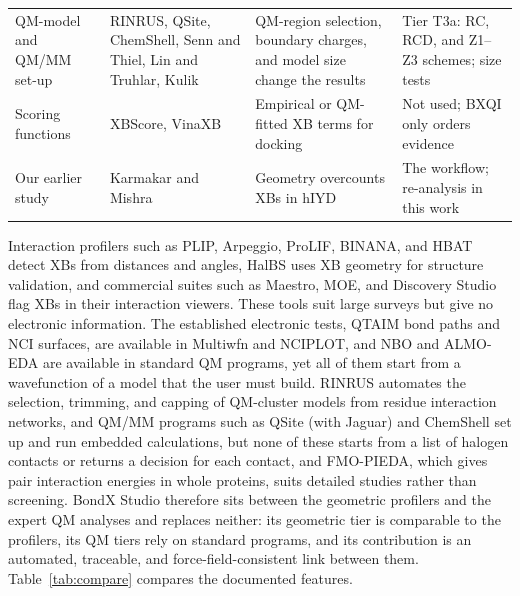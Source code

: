\documentclass[journal=jcisd8,manuscript=article,layout=two-column]{achemso}
\newcommand{\BX}{BondX Studio}
\begin{document}
\begin{table}[t]
\begin{tabularx}{\textwidth}{@{}L{2.4cm} L{4.6cm} >{\raggedright\arraybackslash}X L{3.9cm}@{}}
QM-model and QM/MM set-up & RINRUS,\cite{Summers2021} QSite,\cite{Murphy2000QSite} ChemShell,\cite{Lu2019ChemShell} Senn and Thiel,\cite{SennThiel2009} Lin and Truhlar,\cite{LinTruhlar2005} Kulik\cite{Kulik2016} & QM-region selection, boundary charges, and model size change the results & Tier T3a: RC, RCD, and Z1--Z3 schemes; size tests \\
Scoring functions & XBScore,\cite{Zimmermann2015} VinaXB\cite{Koebel2016} & Empirical or QM-fitted XB terms for docking & Not used; BXQI only orders evidence \\
Our earlier study & Karmakar and Mishra\cite{Karmakar2026} & Geometry overcounts XBs in hIYD & The workflow; re-analysis in this work \\
\bottomrule
\end{tabularx}
\end{table}

Interaction profilers such as PLIP, Arpeggio, ProLIF, BINANA, and HBAT detect XBs from distances and angles,\cite{Salentin2015,Adasme2021,Jubb2017,Bouysset2021,Young2022,HBAT2} HalBS uses XB geometry for structure validation,\cite{HalBS2025} and commercial suites such as Maestro, MOE, and Discovery Studio flag XBs in their interaction viewers.\cite{Maestro,MOE,DiscoveryStudio} These tools suit large surveys but give no electronic information. The established electronic tests, QTAIM bond paths and NCI surfaces,\cite{Bader1991,Johnson2010,ContrerasGarcia2011} are available in Multiwfn and NCIPLOT,\cite{LuChen2012,ContrerasGarcia2011} and NBO and ALMO-EDA are available in standard QM programs,\cite{Reed1988,Horn2016} yet all of them start from a wavefunction of a model that the user must build. RINRUS automates the selection, trimming, and capping of QM-cluster models from residue interaction networks,\cite{Summers2021} and QM/MM programs such as QSite (with Jaguar) and ChemShell set up and run embedded calculations,\cite{Murphy2000QSite,Bochevarov2013,Lu2019ChemShell} but none of these starts from a list of halogen contacts or returns a decision for each contact, and FMO-PIEDA, which gives pair interaction energies in whole proteins,\cite{Fedorov2007} suits detailed studies rather than screening. \BX{} therefore sits between the geometric profilers and the expert QM analyses and replaces neither: its geometric tier is comparable to the profilers, its QM tiers rely on standard programs, and its contribution is an automated, traceable, and force-field-consistent link between them. Table~\ref{tab:compare} compares the documented features.
\end{document}
